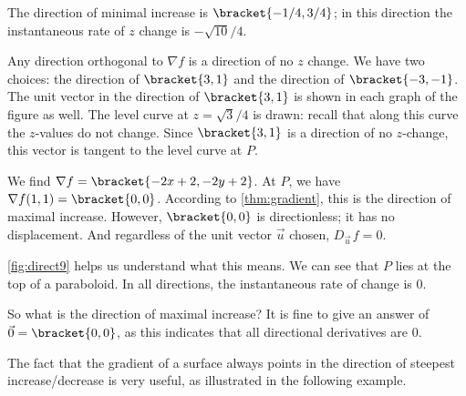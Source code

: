 {%

The direction of minimal increase is $\bracket{-1/4,3/4}$; in this direction the instantaneous rate of $z$ change is $-\sqrt{10}/4%
$.

Any direction orthogonal to $\nabla f$ is a direction of no $z$ change. We have two choices: the direction of $\bracket{3,1}$ and the direction of $\bracket{-3,-1}$. The unit vector in the direction of $\bracket{3,1}$ is shown in each graph of the figure as well. The level curve at $z=\sqrt{3}/4$ is drawn: recall that along this curve the $z$-values do not change. Since $\bracket{3,1}$ is a direction of no $z$-change, this vector is tangent to the level curve at $P$.}

{We find $\nabla f =\bracket{-2x+2, -2y+2}$. At $P$, we have $\nabla f(1,1) =\bracket{0,0}$. 
According to \autoref{thm:gradient}, this is the direction of maximal increase. However, $\bracket{0,0}$ is directionless; it has no displacement. And regardless of the unit vector $\vec u$ chosen, $D_{\vec u\,}f = 0$.


\autoref{fig:direct9} helps us understand what this means. We can see that $P$ lies at the top of a paraboloid. In all directions, the instantaneous rate of change is 0. 

So what is the direction of maximal increase? It is fine to give an answer of $\vec 0 =\bracket{0,0}$, as this indicates that all directional derivatives are 0.}

The fact that the gradient of a surface always points in the direction of steepest increase/decrease is very useful, as illustrated in the following example.

